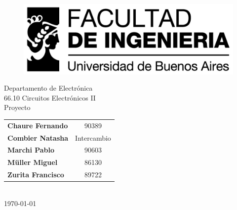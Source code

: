 %
%
\thispagestyle{empty}

\begin{figure}[t]
    \centering
    \includegraphics [scale=0.77]{img/logo_fiuba_alta.jpg}
\end{figure}

\vspace{5.5cm}

\begin{center}
    \Large{Departamento de Electrónica}\\
    \huge{66.10 Circuitos Electrónicos II}\\
    \vspace{.5cm}
    \large{Proyecto}\\
    \vspace{1cm}
    \begin{tabular}{lc}
    \textbf{Chaure Fernando} & 90389 \\
    \textbf{Combier Natasha} & Intercambio \\    
    \textbf{Marchi Pablo} & 90603 \\
    \textbf{Müller Miguel} & 86130 \\
    \textbf{Zurita Francisco} & 89722 \\ 
    \end{tabular}\\
    \vspace{.3cm}
    \small{\today}\\
\end{center}

\vspace{1.5cm}

